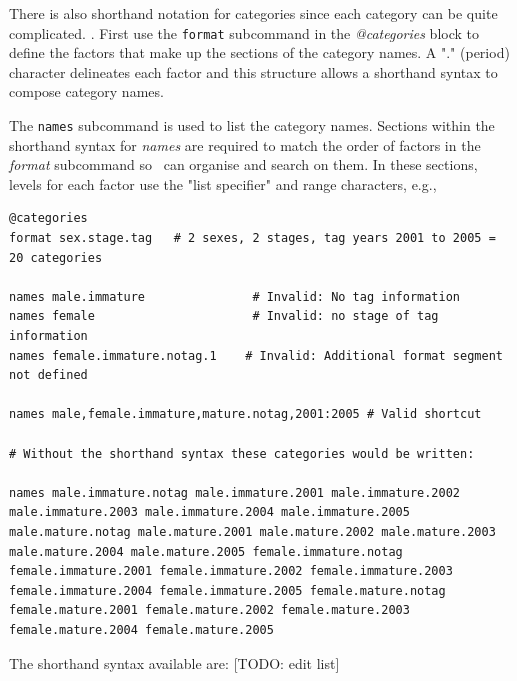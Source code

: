 There is also shorthand notation for categories since each category can be quite complicated. \label{sub:categories}. First use the \texttt{format} subcommand in the \textit{@categories} block to define the factors that make up the sections of the category names. A "." (period) character delineates each factor and this structure allows a shorthand syntax to compose category names. 

The \texttt{names} subcommand is used to list the category names. Sections within the shorthand syntax for \textit{names} are required to match the order of factors in the \textit{format} subcommand so \CNAME\ can organise and search on them. In these sections, levels for each factor use the "list specifier" and range characters, e.g.,

{\small{\begin{lstlisting}
@categories
format sex.stage.tag   # 2 sexes, 2 stages, tag years 2001 to 2005 = 20 categories

names male.immature               # Invalid: No tag information
names female                      # Invalid: no stage of tag information
names female.immature.notag.1    # Invalid: Additional format segment not defined

names male,female.immature,mature.notag,2001:2005 # Valid shortcut

# Without the shorthand syntax these categories would be written:

names male.immature.notag male.immature.2001 male.immature.2002 male.immature.2003 male.immature.2004 male.immature.2005 male.mature.notag male.mature.2001 male.mature.2002 male.mature.2003 male.mature.2004 male.mature.2005 female.immature.notag female.immature.2001 female.immature.2002 female.immature.2003 female.immature.2004 female.immature.2005 female.mature.notag female.mature.2001 female.mature.2002 female.mature.2003 female.mature.2004 female.mature.2005
\end{lstlisting}}}

The shorthand syntax available are: [TODO: edit list]

